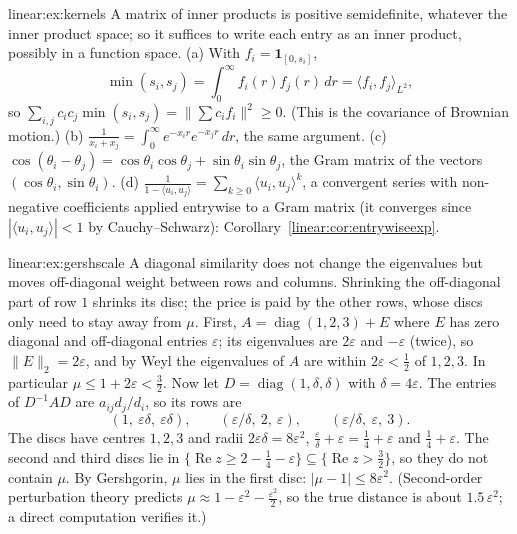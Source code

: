 \begin{solution}{linear:ex:kernels}
\idea A matrix of inner products is positive semidefinite, whatever the inner product space; so it suffices to write each entry as
an inner product, possibly in a function space.
\writeup (a) With $f_i=\mathbf 1_{[0,s_i]}$,
\[
\min(s_i,s_j)=\int_0^\infty f_i(r)f_j(r)\,dr=\langle f_i,f_j\rangle_{L^2},
\]
so $\sum_{i,j}c_ic_j
\min(s_i,s_j)=\|\sum c_if_i\|^2\ge0$. (This is the covariance of Brownian motion.) (b) $\frac1{x_i+x_j}=\int_0^\infty e^{-x_ir}e^{-x_jr}\,dr$, the
same argument. (c) $\cos(\theta_i-\theta_j)=\cos\theta_i\cos\theta_j+\sin\theta_i\sin\theta_j$, the Gram matrix of the vectors
$(\cos\theta_i,\sin\theta_i)$. (d) $\frac1{1-\langle u_i,u_j\rangle}=\sum_{k\ge0}\langle u_i,u_j\rangle^k$, a convergent series with non-negative
coefficients applied entrywise to a Gram matrix (it converges since $|\langle u_i,u_j\rangle|<1$ by Cauchy--Schwarz):
Corollary~\ref{linear:cor:entrywiseexp}.
\end{solution}

\begin{solution}{linear:ex:gershscale}
\idea A diagonal similarity does not change the eigenvalues but moves off-diagonal weight between rows and columns. Shrinking
the off-diagonal part of row $1$ shrinks its disc; the price is paid by the other rows, whose discs only need to stay away from $\mu$.
\writeup First, $A=\operatorname{diag}(1,2,3)+E$ where $E$ has zero diagonal and off-diagonal entries $\varepsilon$; its eigenvalues are $2\varepsilon$
and $-\varepsilon$ (twice), so $\|E\|_2=2\varepsilon$, and by Weyl the eigenvalues of $A$ are within $2\varepsilon<\frac12$ of $1,2,3$. In
particular $\mu\le1+2\varepsilon<\frac32$. Now let $D=\operatorname{diag}(1,\delta,\delta)$ with $\delta=4\varepsilon$. The entries of
$D^{-1}AD$ are $a_{ij}d_j/d_i$, so its rows are
\[
(1,\ \varepsilon\delta,\ \varepsilon\delta),\qquad(\varepsilon/\delta,\ 2,\ \varepsilon),\qquad(\varepsilon/\delta,\ \varepsilon,\ 3).
\]
The discs have centres $1,2,3$ and radii $2\varepsilon\delta=8\varepsilon^2$, $\frac\varepsilon\delta+\varepsilon=\frac14+\varepsilon$ and
$\frac14+\varepsilon$. The second and third discs lie in $\{\operatorname{Re}z\ge2-\frac14-\varepsilon\}\subseteq\{\operatorname{Re}z>\frac32\}$,
so they do not contain $\mu$. By Gershgorin, $\mu$ lies in the first disc: $|\mu-1|\le8\varepsilon^2$. (Second-order perturbation theory
predicts $\mu\approx1-\varepsilon^2-\frac{\varepsilon^2}2$, so the true distance is about $1.5\,\varepsilon^2$; a direct computation verifies it.)
\end{solution}

